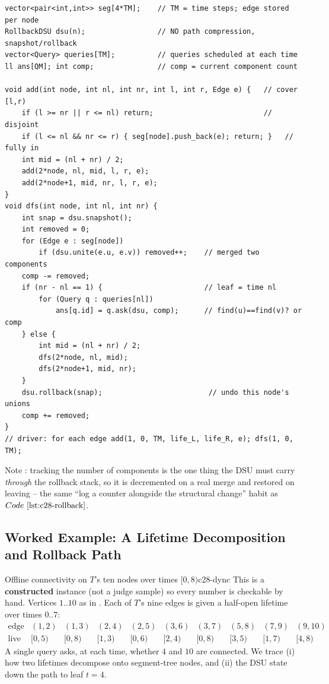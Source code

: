 \begin{lstlisting}[caption={store each edge's lifetime on the segment tree, then one rollback DFS answers every time}, label={lst:c28-segtree-time}]
vector<pair<int,int>> seg[4*TM];    // TM = time steps; edge stored per node
RollbackDSU dsu(n);                 // NO path compression, snapshot/rollback
vector<Query> queries[TM];          // queries scheduled at each time
ll ans[QM]; int comp;               // comp = current component count

void add(int node, int nl, int nr, int l, int r, Edge e) {   // cover [l,r)
    if (l >= nr || r <= nl) return;                          // disjoint
    if (l <= nl && nr <= r) { seg[node].push_back(e); return; }   // fully in
    int mid = (nl + nr) / 2;
    add(2*node, nl, mid, l, r, e);
    add(2*node+1, mid, nr, l, r, e);
}
void dfs(int node, int nl, int nr) {
    int snap = dsu.snapshot();
    int removed = 0;
    for (Edge e : seg[node])
        if (dsu.unite(e.u, e.v)) removed++;    // merged two components
    comp -= removed;
    if (nr - nl == 1) {                        // leaf = time nl
        for (Query q : queries[nl])
            ans[q.id] = q.ask(dsu, comp);      // find(u)==find(v)? or comp
    } else {
        int mid = (nl + nr) / 2;
        dfs(2*node, nl, mid);
        dfs(2*node+1, mid, nr);
    }
    dsu.rollback(snap);                         // undo this node's unions
    comp += removed;
}
// driver: for each edge add(1, 0, TM, life_L, life_R, e); dfs(1, 0, TM);
\end{lstlisting}

Note : tracking the number of components is the one thing the DSU
must carry \emph{through} the rollback stack, so it is decremented on a real
merge and restored on leaving -- the same ``log a counter alongside the
structural change'' habit as \(\coderef{c28-rollback}\).

\subsection{Worked Example: A Lifetime Decomposition and Rollback Path}

\begin{example}{Offline connectivity on \(T\)'s ten nodes over times \([0,8)\)}{c28-dync}
This is a \textbf{constructed} instance (not a judge sample) so every number is
checkable by hand.  Vertices \(1..10\) as in .  Each of \(T\)'s
nine edges is given a half-open lifetime over times \(0..7\):
\[
\renewcommand{\arraystretch}{1.1}
\begin{array}{c|ccccccccc}
\text{edge} & (1,2) & (1,3) & (2,4) & (2,5) & (3,6) & (3,7) & (5,8) & (7,9) & (9,10)\\\hline
\text{live on} & [0,5) & [0,8) & [1,3) & [0,6) & [2,4) & [0,8) & [3,5) & [1,7) & [4,8)
\end{array}
\]
A single query asks, at each time, whether \(4\) and \(10\) are connected.  We
trace (i) how two lifetimes decompose onto segment-tree nodes, and (ii) the DSU
state down the path to leaf \(t=4\).
\end{example}

